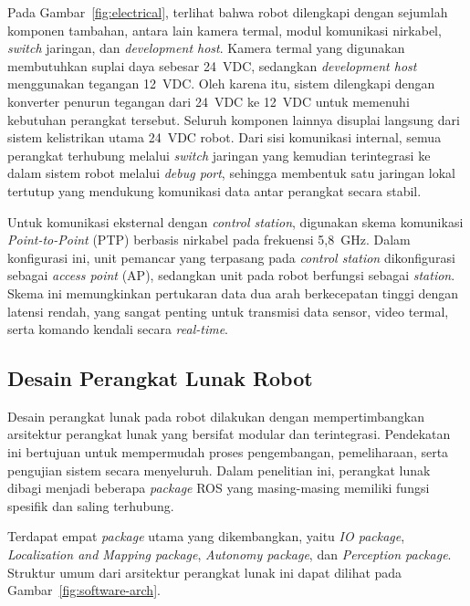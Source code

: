 Pada Gambar~\ref{fig:electrical}, terlihat bahwa robot dilengkapi dengan sejumlah komponen tambahan, antara lain kamera termal, modul komunikasi nirkabel, \emph{switch} jaringan, dan \emph{development host}. Kamera termal yang digunakan membutuhkan suplai daya sebesar 24~VDC, sedangkan \emph{development host} menggunakan tegangan 12~VDC. Oleh karena itu, sistem dilengkapi dengan konverter penurun tegangan dari 24~VDC ke 12~VDC untuk memenuhi kebutuhan perangkat tersebut. Seluruh komponen lainnya disuplai langsung dari sistem kelistrikan utama 24~VDC robot. Dari sisi komunikasi internal, semua perangkat terhubung melalui \emph{switch} jaringan yang kemudian terintegrasi ke dalam sistem robot melalui \emph{debug port}, sehingga membentuk satu jaringan lokal tertutup yang mendukung komunikasi data antar perangkat secara stabil.

Untuk komunikasi eksternal dengan \emph{control station}, digunakan skema komunikasi \emph{Point-to-Point} (PTP) berbasis nirkabel pada frekuensi 5{,}8~GHz. Dalam konfigurasi ini, unit pemancar yang terpasang pada \emph{control station} dikonfigurasi sebagai \emph{access point} (AP), sedangkan unit pada robot berfungsi sebagai \emph{station}. Skema ini memungkinkan pertukaran data dua arah berkecepatan tinggi dengan latensi rendah, yang sangat penting untuk transmisi data sensor, video termal, serta komando kendali secara \emph{real-time}.



\subsection{Desain Perangkat Lunak Robot}
Desain perangkat lunak pada robot dilakukan dengan mempertimbangkan arsitektur perangkat lunak yang bersifat modular dan terintegrasi. Pendekatan ini bertujuan untuk mempermudah proses pengembangan, pemeliharaan, serta pengujian sistem secara menyeluruh. Dalam penelitian ini, perangkat lunak dibagi menjadi beberapa \textit{package} ROS yang masing-masing memiliki fungsi spesifik dan saling terhubung.

Terdapat empat \textit{package} utama yang dikembangkan, yaitu \textit{IO package}, \textit{Localization and Mapping package}, \textit{Autonomy package}, dan \textit{Perception package}. Struktur umum dari arsitektur perangkat lunak ini dapat dilihat pada Gambar~\ref{fig:software-arch}.

